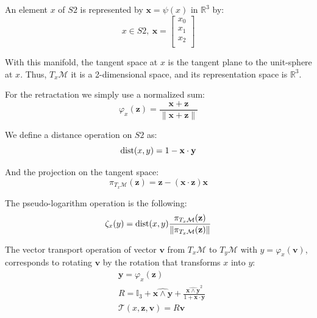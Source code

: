 An element $x$ of $S2$ is represented by $\mathbf{x}=\psi(x)$ in $\mathbb{R}^{3}$ by:
\begin{equation}
  x\in S2,\ \mathbf{x} =\begin{bmatrix}
    x_0\\
    x_1\\
    x_2\\
  \end{bmatrix}
\end{equation}

With this manifold, the tangent space at $x$ is the tangent plane to the unit-sphere at $x$.
Thus, $T_x\mathcal{M}$ it is a 2-dimensional space, and its representation space is $\mathbb{R}^3$.

For the retractation we simply use a normalized sum:
\begin{equation}
  \varphi_x(\mathbf{z}) = \frac{\mathbf{x}+\mathbf{z}}{\|\mathbf{x}+\mathbf{z}\|}
\end{equation}

We define a distance operation on $S2$ as:
\begin{equation}
  \operatorname{dist}(x, y) = 1-\mathbf{x}\cdot \mathbf{y}
\end{equation}

And the projection on the tangent space:
\begin{equation}
  \pi_{T_x\mathcal{M}}(\mathbf{z}) = \mathbf{z} - (\mathbf{x} \cdot \mathbf{z}) \mathbf{x}
\end{equation}

The pseudo-logarithm operation is the following:
\begin{equation}
  \zeta_x(y) = \operatorname{dist}(x,y)\frac{\pi_{T_x\mathcal{M}}(\mathbf{z})}{\|\pi_{T_x\mathcal{M}}(\mathbf{z})\|}
\end{equation}

The vector transport operation of vector $\mathbf{v}$ from $T_x\mathcal{M}$ to $T_y\mathcal{M}$ with $y = \varphi_x(\mathbf{v})$, corresponds to rotating $\mathbf{v}$ by the rotation that transforms $x$ into $y$:
\begin{align}
  &\mathbf{y} = \varphi_x(\mathbf{z}) \\
  &R = \mathbb{I}_3 + \widehat{\mathbf{x} \wedge \mathbf{y}} + \frac{{\widehat{\mathbf{x} \wedge \mathbf{y} } }^2}{1+\mathbf{x}\cdot\mathbf{y}} \\
  &\mathcal{T}(x,\mathbf{z}, \mathbf{v}) = R\mathbf{v}
\end{align}

